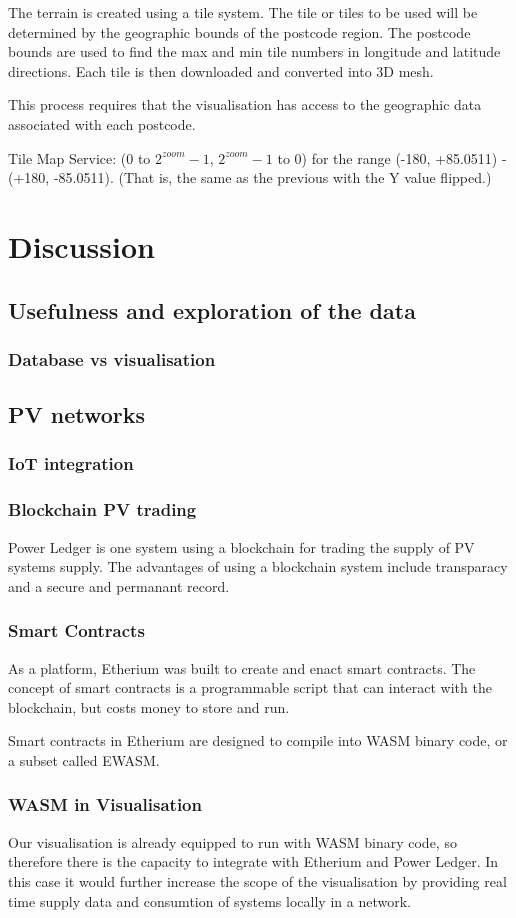 \documentclass[12pt,a4paper]{report}
\begin{document}
The terrain is created using a tile system. The tile or tiles to be used will be determined by the geographic bounds of the postcode region. The postcode bounds are used to find the max and min tile numbers in longitude and latitude directions. Each tile is then downloaded and converted into 3D mesh.

This process requires that the visualisation has access to the geographic data associated with each postcode. 


Tile Map Service: (0 to $2^{zoom}-1$, $2^{zoom}-1$ to 0) for the range (-180, +85.0511) - (+180, -85.0511). (That is, the same as the previous with the Y value flipped.)

\section{Discussion}

\subsection{Usefulness and exploration of the data}
\subsubsection{Database vs visualisation}


\subsection{PV networks}
\subsubsection{IoT integration}
\subsubsection{Blockchain PV trading}
Power Ledger is one system using a blockchain for trading the supply of PV systems supply. The advantages of using a blockchain system include transparacy and a secure and permanant record.
\subsubsection{Smart Contracts}
As a platform, Etherium was built to create and enact smart contracts. The concept of smart contracts is a programmable script that can interact with the blockchain, but costs money to store and run. 

Smart contracts in Etherium are designed to compile into WASM binary code, or a subset called EWASM.
\subsubsection{WASM in Visualisation}
Our visualisation is already equipped to run with WASM binary code, so therefore there is the capacity to integrate with Etherium and Power Ledger. In this case it would further increase the scope of the visualisation by providing real time supply data and consumtion of systems locally in a network.

%
\end{document}
